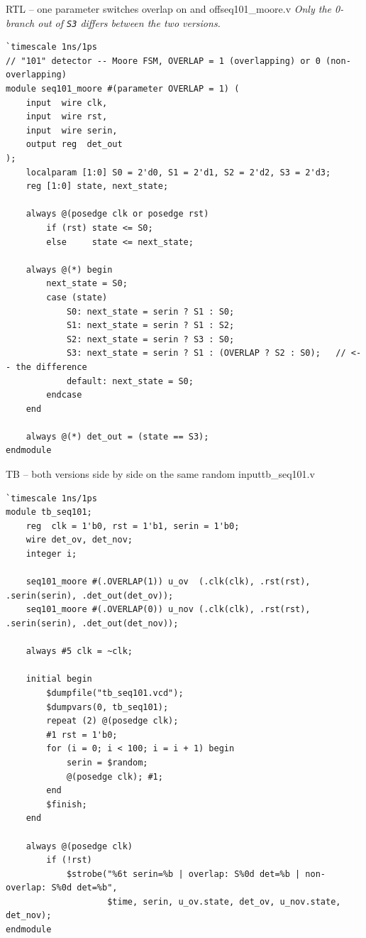 \documentclass[10pt,a4paper]{article}
\newcommand{\slicenote}[1]{{\small\color{black!70}\itshape #1}\par\smallskip}
\begin{document}
\begin{codeslice}{RTL -- one parameter switches overlap on and off}{seq101\_moore.v}
\slicenote{Only the 0-branch out of \texttt{S3} differs between the two versions.}
\begin{lstlisting}
`timescale 1ns/1ps
// "101" detector -- Moore FSM, OVERLAP = 1 (overlapping) or 0 (non-overlapping)
module seq101_moore #(parameter OVERLAP = 1) (
    input  wire clk,
    input  wire rst,
    input  wire serin,
    output reg  det_out
);
    localparam [1:0] S0 = 2'd0, S1 = 2'd1, S2 = 2'd2, S3 = 2'd3;
    reg [1:0] state, next_state;

    always @(posedge clk or posedge rst)
        if (rst) state <= S0;
        else     state <= next_state;

    always @(*) begin
        next_state = S0;
        case (state)
            S0: next_state = serin ? S1 : S0;
            S1: next_state = serin ? S1 : S2;
            S2: next_state = serin ? S3 : S0;
            S3: next_state = serin ? S1 : (OVERLAP ? S2 : S0);   // <-- the difference
            default: next_state = S0;
        endcase
    end

    always @(*) det_out = (state == S3);
endmodule
\end{lstlisting}
\end{codeslice}\begin{codeslice}{TB -- both versions side by side on the same random input}{tb\_seq101.v}
\begin{lstlisting}
`timescale 1ns/1ps
module tb_seq101;
    reg  clk = 1'b0, rst = 1'b1, serin = 1'b0;
    wire det_ov, det_nov;
    integer i;

    seq101_moore #(.OVERLAP(1)) u_ov  (.clk(clk), .rst(rst), .serin(serin), .det_out(det_ov));
    seq101_moore #(.OVERLAP(0)) u_nov (.clk(clk), .rst(rst), .serin(serin), .det_out(det_nov));

    always #5 clk = ~clk;

    initial begin
        $dumpfile("tb_seq101.vcd");
        $dumpvars(0, tb_seq101);
        repeat (2) @(posedge clk);
        #1 rst = 1'b0;
        for (i = 0; i < 100; i = i + 1) begin
            serin = $random;
            @(posedge clk); #1;
        end
        $finish;
    end

    always @(posedge clk)
        if (!rst)
            $strobe("%6t serin=%b | overlap: S%0d det=%b | non-overlap: S%0d det=%b",
                    $time, serin, u_ov.state, det_ov, u_nov.state, det_nov);
endmodule
\end{lstlisting}
\end{codeslice}
\end{document}
